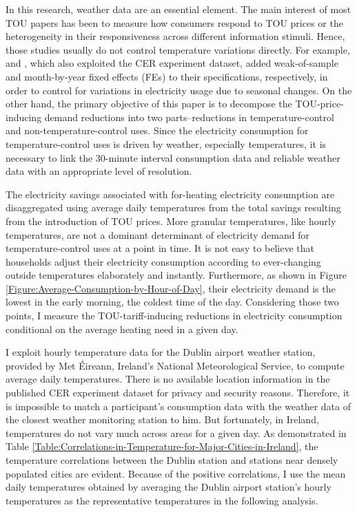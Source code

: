 In this research, weather data are an essential element. The main interest of most TOU papers has been to measure how consumers respond to TOU prices or the heterogeneity in their responsiveness across different information stimuli. Hence, those studies usually do not control temperature variations directly. For example, \cite{The-Effect-of-Information-on-TOU-Electricity-Use:An-Irish-Residential-Study_Pon_2017} and \cite{Peaking-Interest:How-Awareness-Drives-the-Effectiveness-of-Time-of-Use-Electricity-Pricing_Prest_2020}, which also exploited the CER experiment dataset, added weak-of-sample and month-by-year fixed effects (FEs) to their specifications, respectively, in order to control for variations in electricity usage due to seasonal changes. On the other hand, the primary objective of this paper is to decompose the TOU-price-inducing demand reductions into two parts--reductions in temperature-control and non-temperature-control uses. Since the electricity consumption for temperature-control uses is driven by weather, especially temperatures, it is necessary to link the 30-minute interval consumption data and reliable weather data with an appropriate level of resolution. 

The electricity savings associated with for-heating electricity consumption are disaggregated using average daily temperatures from the total savings resulting from the introduction of TOU prices. More granular temperatures, like hourly temperatures, are not a dominant determinant of electricity demand for temperature-control uses at a point in time. It is not easy to believe that households adjust their electricity consumption according to ever-changing outside temperatures elaborately and instantly. Furthermore, as shown in Figure \ref{Figure:Average-Consumption-by-Hour-of-Day}, their electricity demand is the lowest in the early morning, the coldest time of the day. Considering those two points, I measure the TOU-tariff-inducing reductions in electricity consumption conditional on the average heating need in a given day. 

I exploit hourly temperature data for the Dublin airport weather station, provided by Met \'{E}ireann, Ireland's National Meteorological Service, to compute average daily temperatures. There is no available location information in the published CER experiment dataset for privacy and security reasons. Therefore, it is impossible to match a participant's consumption data with the weather data of the closest weather monitoring station to him. But fortunately, in Ireland, temperatures do not vary much across areas for a given day. As demonstrated in Table \ref{Table:Correlations-in-Temperature-for-Major-Cities-in-Ireland}, the temperature correlations between the Dublin station and stations near densely populated cities are evident. Because of the positive correlations, I use the mean daily temperatures obtained by averaging the Dublin airport station's hourly temperatures as the representative temperatures in the following analysis.

